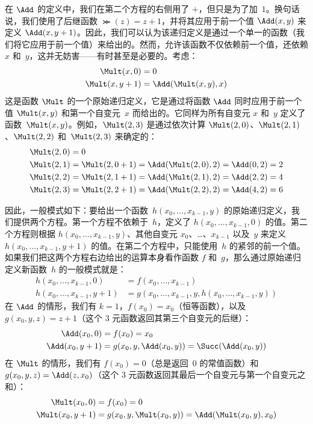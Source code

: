 \documentclass[../../../include/open-logic-section]{subfiles}
\begin{document}
在 $\Add$ 的定义中，我们在第二个方程的右侧用了 $+$，但只是为了加~$1$。换句话说，我们使用了后继函数 $\Succ(z) = z+1$，并将其应用于前一个值 $\Add(x,y)$ 来定义 $\Add(x,y+1)$。因此，我们可以认为该递归定义是通过一个单一的函数（我们将它应用于前一个值）来给出的。然而，允许该函数不仅依赖前一个值，还依赖 $x$ 和~$y$，这并无妨害——有时甚至是必要的。考虑：
\begin{align*}
  \Mult(x,0) & =  0 \\
  \Mult(x,y+1) & =  \Add(\Mult(x,y),x)
\end{align*}
这是函数 $\Mult$ 的一个原始递归定义，它是通过将函数 $\Add$ 同时应用于前一个值 $\Mult(x,y)$ 和第一个自变元~$x$ 而给出的。它同样为所有自变元 $x$ 和~$y$ 定义了函数~$\Mult(x,y)$。例如，$\Mult(2,3)$ 是通过依次计算 $\Mult(2,0)$、$\Mult(2,1)$、$\Mult(2,2)$ 和~$\Mult(2,3)$ 来确定的：
\begin{align*}
  \Mult(2,0) & = 0\\
  \Mult(2,1) & = \Mult(2,0+1) =
  \Add(\Mult(2,0), 2) = \Add(0, 2) = 2\\
  \Mult(2,2) & = \Mult(2,1+1) =
  \Add(\Mult(2,1), 2) = \Add(2, 2) = 4\\
  \Mult(2,3) & = \Mult(2,2+1) =
  \Add(\Mult(2,2), 2) = \Add(4, 2) = 6
\end{align*}

因此，一般模式如下：要给出一个函数~$h(x_0, \dots, x_{k-1}, y)$ 的原始递归定义，我们提供两个方程。第一个方程不依赖于~$h$，定义了 $h(x_0, \dots, x_{k-1}, 0)$ 的值。第二个方程则根据 $h(x_0, \dots, x_{k-1}, y)$、其他自变元 $x_0$、\dots、$x_{k-1}$ 以及~$y$ 来定义 $h(x_0,
\dots, x_{k-1}, y+1)$ 的值。在第二个方程中，只能使用~$h$ 的紧邻的前一个值。如果我们把这两个方程右边给出的运算本身看作函数 $f$ 和~$g$，那么通过原始递归定义新函数~$h$ 的一般模式就是：
\begin{align*}
  h(x_0, \dots, x_{k-1}, 0) & = f(x_0, \dots, x_{k-1})\\
  h(x_0, \dots, x_{k-1}, y+1) & =
  g(x_0, \dots, x_{k-1}, y, h(x_0, \dots, x_{k-1}, y))
\end{align*}
在 $\Add$ 的情形，我们有 $k=1$，$f(x_0) = x_0$（恒等函数），以及 $g(x_0, y, z) = z + 1$（这个 $3$ 元函数返回其第三个自变元的后继）：
\begin{align*}
  \Add(x_0, 0) & = f(x_0) = x_0\\
  \Add(x_0, y+1) & = g(x_0, y, \Add(x_0, y)) =
  \Succ(\Add(x_0, y))
\end{align*}
在 $\Mult$ 的情形，我们有 $f(x_0) = 0$（总是返回~$0$ 的常值函数）和 $g(x_0, y, z) = \Add(z,x_0)$（这个 $3$ 元函数返回其最后一个自变元与第一个自变元之和）：
\begin{align*}
  \Mult(x_0,0) & =  f(x_0) = 0 \\
  \Mult(x_0,y+1) & =  g(x_0, y, \Mult(x_0,y)) =
  \Add(\Mult(x_0,y), x_0)
\end{align*}
\end{document}
